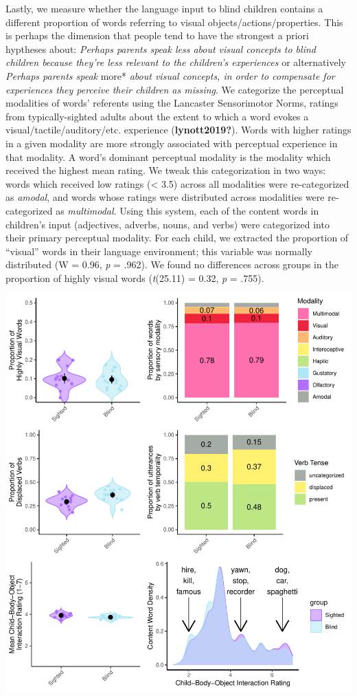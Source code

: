 \documentclass[
  man,floatsintext]{apa6}
\begin{document}
Lastly, we measure whether the language input to blind children contains a different proportion of words referring to visual objects/actions/properties. This is perhaps the dimension that people tend to have the strongest a priori hyptheses about: \emph{Perhaps parents speak less about visual concepts to blind children because they're less relevant to the children's experiences} or alternatively \emph{Perhaps parents speak} more* \emph{about visual concepts, in order to compensate for experiences they perceive their children as missing}. We categorize the perceptual modalities of words' referents using the Lancaster Sensorimotor Norms, ratings from typically-sighted adults about the extent to which a word evokes a visual/tactile/auditory/etc. experience (\textbf{lynott2019?}). Words with higher ratings in a given modality are more strongly associated with perceptual experience in that modality. A word's dominant perceptual modality is the modality which received the highest mean rating. We tweak this categorization in two ways: words which received low ratings (\textless{} 3.5) across all modalities were re-categorized as \emph{amodal}, and words whose ratings were distributed across modalities were re-categorized as \emph{multimodal}. Using this system, each of the content words in children's input (adjectives, adverbs, nouns, and verbs) were categorized into their primary perceptual modality. For each child, we extracted the proportion of ``visual'' words in their language environment; this variable was normally distributed (W = 0.96, \emph{p} = .962). We found no differences across groups in the proportion of highly visual words (\emph{t}(25.11) = 0.32, \emph{p} = .755).

\includegraphics{input_quality_manuscript_files/figure-latex/conceptual-plots-1.pdf}
\end{document}
